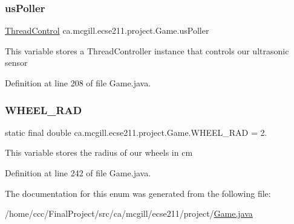 \subsubsection{\texorpdfstring{us\+Poller}{usPoller}}
{\footnotesize\ttfamily \hyperlink{classca_1_1mcgill_1_1ecse211_1_1threads_1_1_thread_control}{Thread\+Control} ca.\+mcgill.\+ecse211.\+project.\+Game.\+us\+Poller}

This variable stores a Thread\+Controller instance that controls our ultrasonic sensor 

Definition at line 208 of file Game.\+java.

\mbox{\label{enumca_1_1mcgill_1_1ecse211_1_1project_1_1_game_a91bd64670c2a91d006c907142783b1f8}} 
\subsubsection{\texorpdfstring{W\+H\+E\+E\+L\+\_\+\+R\+AD}{WHEEL\_RAD}}
{\footnotesize\ttfamily  static  final double ca.\+mcgill.\+ecse211.\+project.\+Game.\+W\+H\+E\+E\+L\+\_\+\+R\+AD = 2.\hspace{0.3cm}{\ttfamily [static]}}

This variable stores the radius of our wheels in cm 

Definition at line 242 of file Game.\+java.



The documentation for this enum was generated from the following file\+:\begin{DoxyCompactItemize}
\item 
/home/ccc/\+Final\+Project/src/ca/mcgill/ecse211/project/\hyperlink{_game_8java}{Game.\+java}\end{DoxyCompactItemize}
